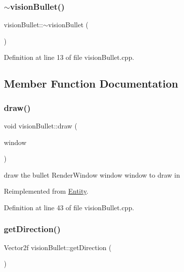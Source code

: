 \subsubsection{\texorpdfstring{$\sim$vision\+Bullet()}{~visionBullet()}}
{\footnotesize\ttfamily vision\+Bullet\+::$\sim$vision\+Bullet (\begin{DoxyParamCaption}{ }\end{DoxyParamCaption})}



Definition at line 13 of file vision\+Bullet.\+cpp.



\subsection{Member Function Documentation}
\mbox{\label{classvision_bullet_ab2f4d4a63991b39480e3064ed5ee3809}} 
\subsubsection{\texorpdfstring{draw()}{draw()}}
{\footnotesize\ttfamily void vision\+Bullet\+::draw (\begin{DoxyParamCaption}\item[{Render\+Window \&}]{window }\end{DoxyParamCaption})\hspace{0.3cm}{\ttfamily [virtual]}}

draw the bullet Render\+Window window window to draw in 

Reimplemented from \hyperlink{class_entity_a030c3aa6641df7981a2d8a3fba890ec7}{Entity}.



Definition at line 43 of file vision\+Bullet.\+cpp.

\mbox{\label{classvision_bullet_a381783842104058048b9abffb693d55e}} 
\subsubsection{\texorpdfstring{get\+Direction()}{getDirection()}}
{\footnotesize\ttfamily Vector2f vision\+Bullet\+::get\+Direction (\begin{DoxyParamCaption}{ }\end{DoxyParamCaption})}

